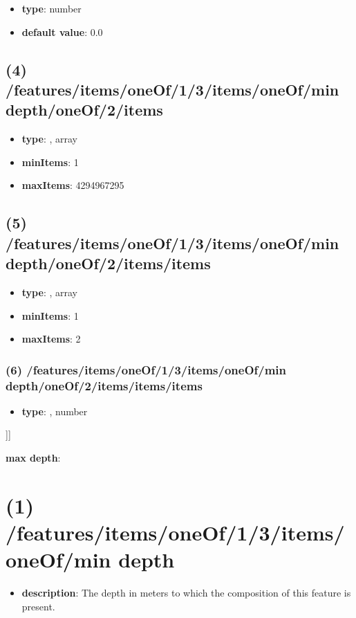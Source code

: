 \begin{itemize}[leftmargin=5em]\item {\bf type}: number\item {\bf default value}: 0.0
\end{itemize}\subsection{(4) /features/items/oneOf/1/3/items/oneOf/min depth/oneOf/2/items}
\begin{itemize}[leftmargin=4em]\item {\bf type}: , array\item {\bf minItems}: 1
\item {\bf maxItems}: 4294967295
\end{itemize}\subsection{(5) /features/items/oneOf/1/3/items/oneOf/min depth/oneOf/2/items/items}
\begin{itemize}[leftmargin=5em]\item {\bf type}: , array\item {\bf minItems}: 1
\item {\bf maxItems}: 2
\end{itemize}\subsubsection{(6) /features/items/oneOf/1/3/items/oneOf/min depth/oneOf/2/items/items/items}
\begin{itemize}[leftmargin=6em]\item {\bf type}: , number\end{itemize}]]\item {\bf max depth}: \section{(1) /features/items/oneOf/1/3/items/oneOf/min depth}
\begin{itemize}[leftmargin=1em]\item {\bf description}: The depth in meters to which the composition of this feature is present.
\end{itemize}
